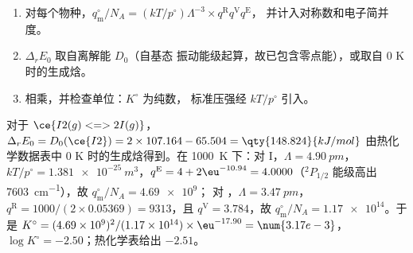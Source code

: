 \begin{method}[由光谱数据计算平衡常数]\label{met:b3:statistical-thermo-applied:k-stat}
\begin{enumerate}
  \item 对每个物种，$q^\circ_{\mathrm m}/N_A = (kT/p^\circ)\Lambda^{-3}\times q^{\mathrm R}q^{\mathrm V}q^{\mathrm E}$，
        并计入对称数和电子简并度。
  \item $\Delta_rE_0$ 取自离解能 $D_0$（自基态
        振动能级起算，故已包含零点能），或取自
        0 K 时的生成焓。
  \item 相乘，并检查单位：$K^\circ$ 为纯数，
        标准压强经 $kT/p^\circ$ 引入。
\end{enumerate}
\end{method}

\begin{example}[碘的离解]\label{ex:b3:statistical-thermo-applied:iodine}
对于 $\ce{I2(g) <=> 2 I(g)}$，$\Delta_rE_0 = D_0(\ce{I2}) = 2 \times 107.164 - 65.504 = \qty{148.824}{kJ/mol}$
由热化学数据表中 0 K 时的生成焓得到。在
\qty{1000}{K} 下：对 I，$\Lambda = \qty{4.90}{pm}$，$kT/p^\circ = \qty{1.381e-25}{m^3}$，$q^{\mathrm E} = 4 +
2\eu^{-10.94} = 4.0000$（${}^2P_{1/2}$ 能级高出 \qty{7603}{cm^{-1}}），故 $q^\circ_{\mathrm m}/N_A = \num{4.69e9}$；
对 ，$\Lambda = \qty{3.47}{pm}$，$q^{\mathrm R} = 1000/(2 \times 0.05369) = 9313$，且 $q^{\mathrm V} = 3.784$，故
$q^\circ_{\mathrm m}/N_A = \num{1.17e14}$。于是 $K^\circ = (4.69\times10^9)^2/(1.17\times10^{14}) \times \eu^{-17.90} =
\num{3.17e-3}$，$\log K^\circ = -2.50$；热化学表给出 $-2.51$。
\end{example}

